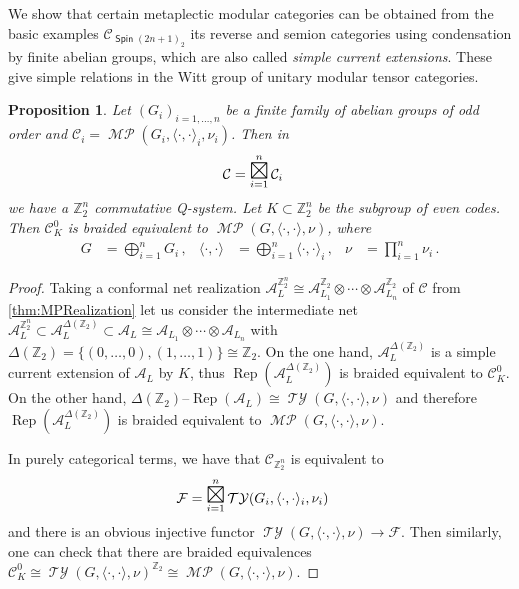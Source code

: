 \documentclass[twoside,11pt,reqno]{amsart}
\newtheorem{prop}[thm]{Proposition}
\theoremstyle{definition}
\theoremstyle{remark}
\newcommand{\Spin}{\mathop{\mathsf{Spin}}}
\newcommand{\cF}{\mathcal{F}}
\newcommand{\cC}{\mathcal{C}}
\newcommand{\A}{\mathcal{A}}
\newcommand{\ZZ}{\mathbb{Z}}
\DeclareMathOperator{\Rep}{Rep}
\DeclareMathOperator*{\TY}{\mathcal{TY}}
\DeclareMathOperator*{\MP}{\mathcal{MP}}
\newcommand{\tRep}[1]{#1\text{--}\Rep}
\newcommand{\umtc}[1]{\cC_{#1}}
\newcommand{\bi}[2]{\langle #1,#2\rangle}
\newcommand{\bislotslot}{\bi\cdot\cdot}
\newcommand{\myemph}[1]{\emph{#1}}
\begin{document}
We show that certain metaplectic modular categories can be obtained
from the basic examples $\umtc{\Spin(2n+1)_2}$ its reverse and semion 
categories using condensation by finite abelian groups, which are also
called \myemph{simple current extensions}.
These give simple relations in the Witt group of 
unitary modular tensor categories.
\begin{prop}
  Let $(G_i)_{i=1,\ldots,n}$ be a finite family of abelian groups of odd order
  and $\cC_i=\MP(G_i,\bislotslot_i,\nu_i)$.
  Then in 
  \begin{align}
    \cC&=%
    \mathop{\mathlarger{\mathlarger{\mathlarger{\boxtimes}}}}
    \limits_{i=1}^n \cC_i
  \end{align}
  we have a $\ZZ_2^n$ commutative Q-system. 
  Let $K\subset \ZZ_2^n$ be the subgroup of even codes.
  Then $\cC_K^0$ is braided equivalent to $\MP(G,\bislotslot,\nu)$, where
  \begin{align}
    G&=\bigoplus_{i=1}^n G_i\,,&\bislotslot&=  \bigoplus_{i=1}^n
    \bislotslot_i\,,
   &\nu&=\prod_{i=1}^n\nu_i\,.
  \end{align}
\end{prop}
\begin{proof}
  Taking a conformal net realization 
  $\A_L^{\ZZ_2^n}\cong\A^{\ZZ_2}_{L_1}\otimes\cdots\otimes \A^{\ZZ_2}_{L_n}$
  of $\cC$ from \ref{thm:MPRealization} let us consider the intermediate net 
  $\A_L^{\ZZ_2^n}\subset \A_L^{\Delta(\ZZ_2)}\subset\A_L\cong
  \A_{L_1}\otimes\cdots\otimes \A_{L_n}$ with 
  $\Delta(\ZZ_2)=\{(0,\ldots,0),(1,\ldots,1)\}\cong \ZZ_2$.
  On the one hand,  $\A_L^{\Delta(\ZZ_2)}$ is a simple current extension of 
  $\A_L$ by $K$, thus $\Rep(\A_L^{\Delta(\ZZ_2)})$ 
  is braided equivalent to $\cC_K^0$. 
  On the other hand,
  $\tRep{\Delta(\ZZ_2)}(\A_L)\cong \TY(G,\bislotslot,\nu)$ and therefore 
  $\Rep(\A_L^{\Delta(\ZZ_2)})$ is braided equivalent to
  $\MP(G,\bislotslot,\nu)$. 

  In purely categorical terms, we have that $\cC_{\ZZ_2^n}$ is equivalent to 
  \begin{align}
    \cF&=%
    \mathop{\mathlarger{\mathlarger{\mathlarger{\boxtimes}}}}
    \limits_{i=1}^n \TY(G_i,\bislotslot_i,\nu_i)
  \end{align}
  and there is an obvious injective functor
  $\TY(G,\bislotslot,\nu)\to \cF$. 
  Then similarly, one can check that there are braided equivalences
  $\cC_K^0 \cong  
    \TY(G,\bislotslot,\nu)^{\ZZ_2}\cong
    \MP(G,\bislotslot,\nu)$.
\end{proof}
\end{document}
